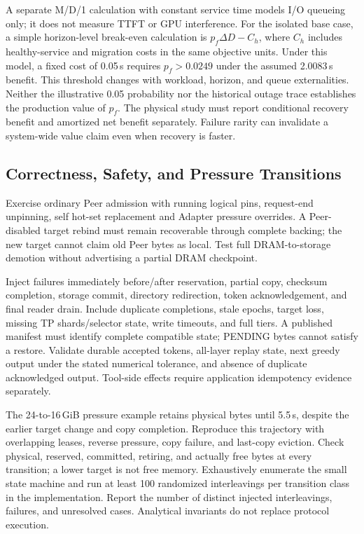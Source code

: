 \documentclass[sigplan,10pt,anonymous,nonacm]{acmart}
\begin{document}
A separate M/D/1 calculation with constant service time models I/O queueing only; it does not measure TTFT or GPU interference. For the isolated base case, a simple horizon-level
break-even calculation is $p_f\Delta D-C_h$, where $C_h$ includes
healthy-service and migration costs in the same objective units.
Under this model, a fixed cost of 0.05\,s
requires $p_f>0.0249$ under the assumed 2.0083\,s benefit. This threshold
changes with workload, horizon, and queue externalities. Neither the
illustrative 0.05 probability nor the historical outage trace establishes
the production value of $p_f$. The physical study must report conditional
recovery benefit and amortized net benefit separately. Failure rarity
can invalidate a system-wide value claim even when recovery is faster.

\FloatBarrier
\subsection{Correctness, Safety, and Pressure Transitions}

Exercise ordinary Peer admission with running logical pins, request-end
unpinning, self hot-set replacement and Adapter pressure overrides.
A Peer-disabled target rebind must remain recoverable through complete
backing; the new target cannot claim old Peer bytes as local. Test full
DRAM-to-storage demotion without advertising a partial DRAM checkpoint.

Inject failures immediately before/after reservation, partial copy,
checksum completion, storage commit, directory redirection, token
acknowledgement, and final reader drain. Include duplicate completions,
stale epochs, target loss, missing TP shards/selector state, write timeouts,
and full tiers. A published manifest must identify complete compatible
state; PENDING bytes cannot satisfy a restore. Validate durable accepted
tokens, all-layer replay state, next greedy output under the stated
numerical tolerance, and absence of duplicate acknowledged output.
Tool-side effects require application idempotency evidence separately.

The 24-to-16\,GiB pressure example retains physical bytes until 5.5\,s,
despite the earlier target change and copy completion. Reproduce this
trajectory with overlapping leases, reverse pressure, copy failure,
and last-copy eviction. Check physical, reserved, committed, retiring,
and actually free bytes at every transition; a lower target is not free
memory. Exhaustively enumerate the small state machine and run at least
100 randomized interleavings per transition class in the implementation.
Report the number of distinct injected interleavings, failures, and
unresolved cases. Analytical invariants do not replace protocol execution.
\end{document}
